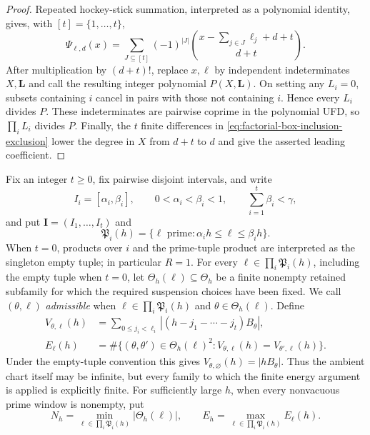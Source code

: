 \documentclass[11pt,reqno]{amsart}
\theoremstyle{definition}
\theoremstyle{remark}
\begin{document}
\begin{proof}
Repeated hockey-stick summation, interpreted as a polynomial identity,
gives, with $[t]=\{1,\ldots,t\}$,
\begin{equation}\label{eq:factorial-box-inclusion-exclusion}
 \Psi_{\boldsymbol\ell,d}(x)
 =\sum_{J\subseteq[t]}(-1)^{|J|}
  \binom{x-\sum_{j\in J}\ell_j+d+t}{d+t}.
\end{equation}
After multiplication by $(d+t)!$, replace $x,\boldsymbol\ell$ by independent
indeterminates $X,\mathbf L$ and call the resulting integer polynomial
$P(X,\mathbf L)$.  On setting any $L_i=0$, subsets
containing $i$ cancel in pairs with those not containing $i$.  Hence every
$L_i$ divides $P$.  These indeterminates are pairwise coprime in the
polynomial UFD, so $\prod_iL_i$ divides $P$.  Finally, the $t$ finite
differences in \eqref{eq:factorial-box-inclusion-exclusion} lower the degree in $X$ from
$d+t$ to $d$ and give the asserted leading coefficient.
\end{proof}

Fix an integer $t\geq0$, fix pairwise disjoint intervals, and write
\begin{equation}\label{eq:amplifier-prime-windows}
 I_i=[\alpha_i,\beta_i],\qquad
 0<\alpha_i<\beta_i<1,
 \qquad \sum_{i=1}^{t}\beta_i<\gamma,
\end{equation}
and put $\mathbf I=(I_1,\ldots,I_t)$ and
\[
 \mathfrak P_i(h)
 =\{\ell\text{ prime}:\alpha_i h\leq\ell\leq\beta_i h\}.
\]
When $t=0$, products over $i$ and the prime-tuple product are interpreted as
the singleton empty tuple; in particular $R=1$.  For every
$\boldsymbol\ell\in\prod_i\mathfrak P_i(h)$, including the empty tuple when
$t=0$, let $\Theta_h(\boldsymbol\ell)\subseteq\Theta_h$ be a finite nonempty
retained subfamily for which the required suspension choices have been fixed.
We call
$(\theta,\boldsymbol\ell)$ \emph{admissible} when
$\boldsymbol\ell\in\prod_i\mathfrak P_i(h)$ and
$\theta\in\Theta_h(\boldsymbol\ell)$.  Define
\begin{align}
 V_{\theta,\boldsymbol\ell}(h)
 &=\sum_{0\leq j_i<\ell_i}
   |(h-j_1-\cdots-j_t)B_\theta|,
 \label{eq:amplifier-value}\\
 E_{\boldsymbol\ell}(h)
 &=\#\{(\theta,\theta')\in\Theta_h(\boldsymbol\ell)^2:
 V_{\theta,\boldsymbol\ell}(h)
 =V_{\theta',\boldsymbol\ell}(h)\}.
 \label{eq:amplifier-energy}
\end{align}
Under the empty-tuple convention this gives
$V_{\theta,\varnothing}(h)=|hB_\theta|$.  Thus the ambient chart itself may be
infinite, but every family to which the finite energy argument is applied is
explicitly finite.
For sufficiently large $h$, when every nonvacuous prime window is nonempty,
put
\[
 N_h=\min_{\boldsymbol\ell\in\prod_i\mathfrak P_i(h)}
       |\Theta_h(\boldsymbol\ell)|,
 \qquad
 E_h=\max_{\boldsymbol\ell\in\prod_i\mathfrak P_i(h)}
       E_{\boldsymbol\ell}(h).
\]
\end{document}
